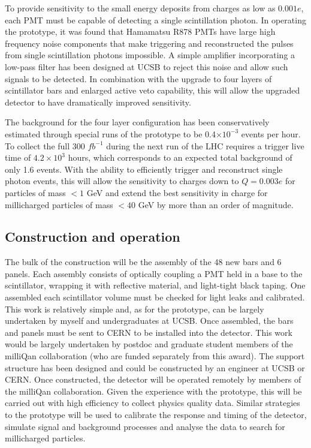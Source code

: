 \documentclass[11pt]{article}
\theoremstyle{plain} \numberwithin{equation}{section}
\theoremstyle{definition}
\begin{document}
To provide sensitivity to the small energy deposits from charges as low as $0.001 e$,
each PMT must be capable of detecting a single scintillation photon.
In operating the prototype, it was found that Hamamatsu R878 PMTs have large high frequency noise components
that make triggering and reconstructed the pulses from single scintillation photons impossible.
A simple amplifier incorporating a low-pass filter has been designed at UCSB to reject this noise and
allow such signals to be detected. In combination with the upgrade to four layers of scintillator bars
and enlarged active veto capability, this will allow the upgraded detector to have dramatically improved sensitivity.

The background for the four layer configuration has been conservatively estimated
through special runs of the prototype to be 0.4$\times10^{-3}$ events per hour. 
To collect the full 300 $fb^{-1}$ during the next run of the LHC 
requires a trigger live time of $4.2\times 10^3$ hours, which corresponds 
to an expected total background of only 1.6 events. With the ability to efficiently trigger
and reconstruct single photon events, this will allow the sensitivity to charges down to $Q=0.003 e$ for particles of
mass $< 1$ GeV and extend the best sensitivity in charge for millicharged particles of mass $< 40$ GeV
by more than an order of magnitude.

\subsection*{Construction and operation}

The bulk of the construction will be the assembly of the 48 new bars and 6 panels.
Each assembly consists of optically coupling a PMT held in a base
to the scintillator, wrapping it with reflective material, and light-tight black
taping. One assembled each scintillator volume must be checked for light leaks and calibrated.
This work is relatively simple and, as for the prototype, can be largely undertaken
by myself and undergraduates at UCSB. Once assembled, the bars and panels
must be sent to CERN to be installed into the detector. This work would be largely 
undertaken by postdoc and graduate student members of the milliQan collaboration 
(who are funded separately from this award). The support structure has been designed and could be 
constructed by an engineer at UCSB or CERN. Once constructed, the detector will be operated
remotely by members of the milliQan collaboration. Given the experience with the
prototype, this will be carried out with high efficiency to collect physics quality
data. Similar strategies to the prototype will be used to calibrate the response and timing of the 
detector, simulate signal and background processes and analyse the data to 
search for millicharged particles.
\end{document}
